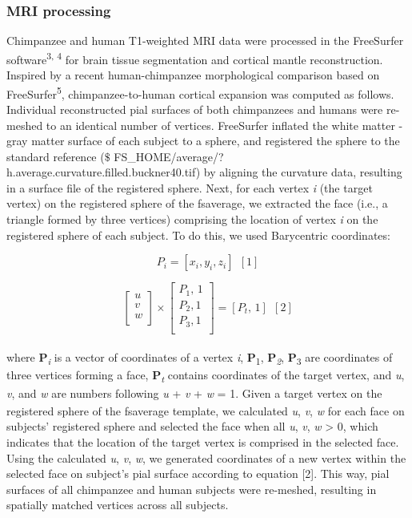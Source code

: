 \begin{refsection}
\subsubsection*{MRI processing}
Chimpanzee and human T1-weighted MRI data were processed in the FreeSurfer software\textsuperscript{3, 4} for brain tissue segmentation and cortical mantle reconstruction. Inspired by a recent human-chimpanzee morphological comparison based on FreeSurfer\textsuperscript{5}, chimpanzee-to-human cortical expansion was computed as follows. Individual reconstructed pial surfaces of both chimpanzees and humans were re-meshed to an identical number of vertices. FreeSurfer inflated the white matter - gray matter surface of each subject to a sphere, and registered the sphere to the standard reference ($\$$ FS\_HOME/average/?h.average.curvature.filled.buckner40.tif) by aligning the curvature data, resulting in a surface file of the registered sphere. Next, for each vertex \textit{i} (the target vertex) on the registered sphere of the fsaverage, we extracted the face (i.e., a triangle formed by three vertices) comprising the location of vertex \textit{i} on the registered sphere of each subject. To do this, we used Barycentric coordinates:

\[ P_{i}= [x_{i}, y_{i}, z_{i}] \ \ [1] \]

\[  \left[ \begin{matrix}
u\\
v\\
w\\
\end{matrix}
 \right]  \times  \left[ \begin{matrix}
P_{1}\text{, 1}\\
P_{2},1\\
P_{3},1\\
\end{matrix}
 \right] = \left[ P_{t}\text{, 1} \right] \ \ [2] \] \\

where \textbf{P}\textit{\textsubscript{i}} is a vector of coordinates of a vertex \textit{i}, \textbf{P}\textsubscript{1}, \textbf{P}\textit{\textsubscript{2}}, \textbf{P}\textsubscript{3} are coordinates of three vertices forming a face, \textbf{P}\textit{\textsubscript{t}}\textsubscript{ }contains coordinates of the target vertex, and \textit{u}, \textit{v}, and \textit{w} are numbers following \textit{u} + \textit{v} + \textit{w} = 1. Given a target vertex\textit{\textsubscript{ }}on the registered sphere of the fsaverage template, we calculated \textit{u}, \textit{v}, \textit{w }for each face on subjects’ registered sphere and selected the face when all \textit{u}, \textit{v}, \textit{w} > 0, which indicates that the location of the target vertex is comprised in the selected face. Using the calculated \textit{u}, \textit{v}, \textit{w}, we generated coordinates of a new vertex within the selected face on subject’s pial surface according to equation [2]. This way, pial surfaces of all chimpanzee and human subjects were re-meshed, resulting in spatially matched vertices across all subjects.


\end{refsection}
